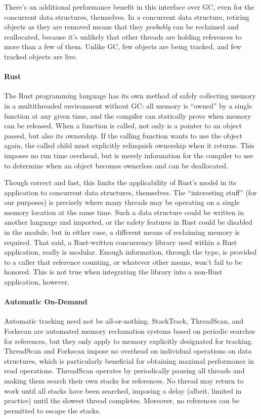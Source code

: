 There's an additional performance benefit in this interface over GC, even for the concurrent data structures, themselves.  In a concurrent data structure, retiring objects as they are removed means that they \textit{probably} can be reclaimed and reallocated, because it's unlikely that other threads are holding references to more than a few of them.  Unlike GC, few objects are being tracked, and few tracked objects are live.

\paragraph{Rust} The Rust programming language has its own method of safely collecting memory in a multithreaded environment without GC: all memory is ``owned'' by a single function at any given time, and the compiler can statically prove when memory can be released.\cite{Rust}  When a function is called, not only is a pointer to an object passed, but also its ownership.  If the calling function wants to use the object again, the called child must explicitly relinquish ownership when it returns.  This imposes no run time overhead, but is merely information for the compiler to use to determine when an object becomes ownerless and can be deallocated.

Though correct and fast, this limits the applicability of Rust's model in its application to concurrent data structures, themselves.  The ``interesting stuff'' (for our purposes) is precisely where many threads may be operating on a single memory location at the same time.  Such a data structure could be written in another language and imported, or the safety features in Rust could be disabled in the module, but in either case, a different means of reclaiming memory is required.  That said, a Rust-written concurrency library used within a Rust application, really is modular.  Enough information, through the type, is provided to a caller that reference counting, or whatever other means, won't fail to be honored.  This is not true when integrating the library into a non-Rust application, however.

\paragraph{Automatic On-Demand} Automatic tracking need not be all-or-nothing.  StackTrack\cite{StackTrack}, ThreadScan\cite{Threadscan}, and Forkscan\cite{Forkscan} are automated memory reclamation systems based on periodic searches for references, but they only apply to memory explicitly designated for tracking.  ThreadScan and Forkscan impose no overhead on individual operations on data structures, which is particularly beneficial for obtaining maximal performance in read operations.  ThreadScan operates by periodically pausing all threads and making them search their own stacks for references.  No thread may return to work until all stacks have been searched, imposing a delay (albeit, limited in practice) until the slowest thread completes.  Moreover, no references can be permitted to escape the stacks.

